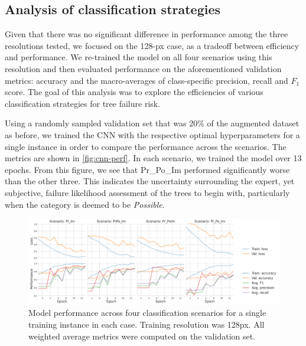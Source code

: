 \documentclass[Journal, letterpaper, DoubleSpace, InsideFigs]{ascelike-new}
\begin{document}
 
\subsection{Analysis of classification strategies}
Given that there was no significant difference in performance among the three resolutions tested, we focused 
on the 128-px case, as a tradeoff between efficiency and performance. We re-trained the model on all four
scenarios using this resolution and then evaluated performance on the aforementioned validation metrics: accuracy and the macro-averages of
class-specific precision, recall and $F_{1}$ score.
The goal of this analysis was to explore the efficiencies of various classification strategies for tree failure risk.

Using a randomly sampled validation set that was 20\% of the augmented dataset as before, we trained the CNN with the
respective optimal hyperparameters for a single instance in order to compare the performance across the scenarios. The
metrics are shown in \autoref{fig:cnn-perf}.  In each scenario, we trained the model over 13 epochs. %
From this figure, we see that Pr\_Po\_Im performed significantly worse than the other three. This indicates the
uncertainty surrounding the expert, yet subjective, failure likelihood assessment of the trees to begin
with, particularly when the category is deemed to be \textit{Possible}. %

\begin{figure}[ht]
    \centering
    \includegraphics[width=1.05\textwidth]{cnn-performance-metrics-128px-plot}
    \caption{Model performance across four classification scenarios for a single training instance in each case. Training resolution was 128px. All weighted average metrics were computed on the validation set.}
    \label{fig:cnn-perf}
\end{figure}
\end{document}

